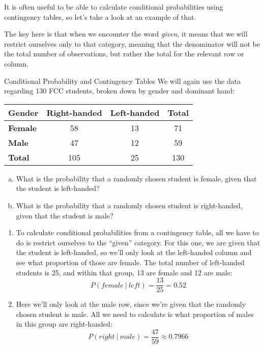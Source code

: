 \vfill
\pagebreak

It is often useful to be able to calculate conditional probabilities using contingency tables, so let's take a look at an example of that.

The key here is that when we encounter the word \emph{given}, it means that we will restrict ourselves only to that category, meaning that the denominator will not be the total number of observations, but rather the total for the relevant row or column.

\begin{example}[https://www.youtube.com/watch?v=0oCoc5B1lVU&list=PLfmpjsIzhzts14-9s5QixRje97EI2oeMF&index=25]{Conditional Probability and Contingency Tables}
We will again use the data regarding 130 FCC students, broken down by gender and dominant hand:
\begin{center}
\begin{tabular}{l | c c | c}
\textbf{Gender} & \textbf{Right-handed} & \textbf{Left-handed} & \textbf{Total} \\ \hline 
\textbf{Female} & 58 & 13 & 71\\
\textbf{Male} & 47 & 12 & 59  \\ \hline
\textbf{Total} & 105 & 25 & 130 \\ 
\end{tabular}
\end{center}
\begin{enumerate}[(a)]
\item What is the probability that a randomly chosen student is female, given that the student is left-handed?
\item What is the probability that a randomly chosen student is right-handed, given that the student is male?
\end{enumerate}

\sol
\begin{enumerate}
\item To calculate conditional probabilities from a contingency table, all we have to do is restrict ourselves to the ``given'' category.  For this one, we are given that the student is left-handed, so we'll only look at the left-handed column and see what proportion of those are female.  The total number of left-handed students is 25, and within that group, 13 are female and 12 are male:
\[P(female \ | \ left) = \boxed{\frac{13}{25} = 0.52}\]

\item Here we'll only look at the male row, since we're given that the randomly chosen student is male.  All we need to calculate is what proportion of males in this group are right-handed:
\[P(right \ | \ male) = \boxed{\frac{47}{59} \approx 0.7966}\]
\end{enumerate}
\end{example}

